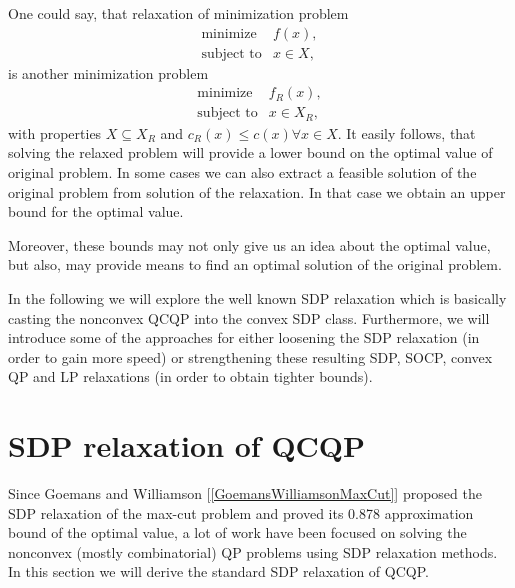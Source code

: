 \documentclass[12pt]{book}
\theoremstyle{definition}
\begin{document}
One could say, that relaxation of minimization problem 
\begin{equation}
\begin{array}{ll}
\mbox{minimize} & f(x), \\
\mbox{subject to} & x\in X,
\end{array}
\end{equation}
is another minimization problem  
\begin{equation}
\begin{array}{ll}
\mbox{minimize} & f_R(x), \\
\mbox{subject to} & x\in X_R,
\end{array}
\end{equation}
with properties $X\subseteq X_R$ and $c_R(x)\leq c(x) \forall x\in X$.
It easily follows, that solving the relaxed problem will provide a lower bound on the optimal value of original problem. In some cases we can also extract a feasible solution of the original problem from solution of the relaxation. In that case we obtain an upper bound for the optimal value. 

Moreover, these bounds may not only give us an idea about the optimal value, but also, may provide means to find an optimal solution of the original problem. 

In the following we will explore the well known SDP  relaxation which is basically casting the nonconvex QCQP into the convex SDP class.
Furthermore, we will introduce some of the approaches for either loosening the SDP relaxation (in order to gain more speed) or strengthening these resulting SDP, SOCP, convex QP and LP relaxations (in order to obtain tighter bounds).



\section{SDP relaxation of QCQP}
\label{SectionSDPRelax}

Since Goemans and Williamson [\ref{GoemansWilliamsonMaxCut}] proposed the SDP relaxation of the max-cut problem and proved its 0.878 approximation bound of the optimal value, a lot of work have been focused on solving the nonconvex (mostly combinatorial) QP problems using SDP relaxation methods. In this section we will derive the standard SDP relaxation of QCQP. 
\end{document}
